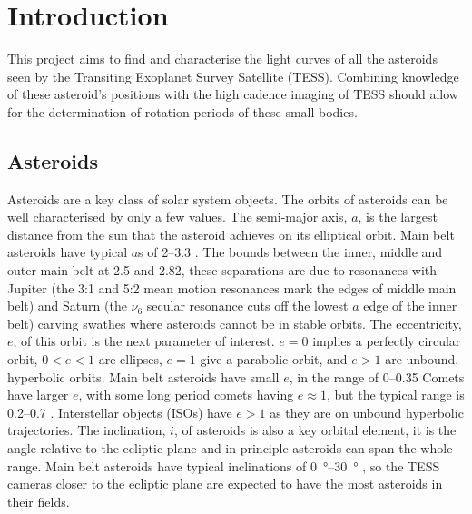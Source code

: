 \documentclass{UCreport}
\begin{document}
\toc %

\listoffigures
\newpage
{}
\listoftables
\newpage


\section{Introduction}\label{Sec:Intro}

This project aims to find and characterise the light curves of all the asteroids seen by the Transiting Exoplanet Survey Satellite (TESS).
Combining knowledge of these asteroid's positions with the high cadence imaging of TESS should allow for the determination of rotation periods of these small bodies.


\subsection{Asteroids}\label{SubSec:Asteroid}

Asteroids are a key class of solar system objects.
The orbits of asteroids can be well characterised by only a few values. The semi-major axis, $a$, is the largest distance from the sun that the asteroid achieves on its elliptical orbit.
Main belt asteroids have typical $a$s of \qtyrange{2}{3.3}{\au} \citet{DeMeo2015}.
The bounds between the inner, middle and outer main belt at \qty{2.5}{\au} and \qty{2.82}{\au}, these separations are due to resonances with Jupiter (the 3:1 and 5:2 mean motion resonances mark the edges of middle main belt) and Saturn (the $\nu_6$ secular resonance cuts off the lowest $a$ edge of the inner belt) carving swathes where asteroids cannot be in stable orbits.
The eccentricity, $e$, of this orbit is the next parameter of interest. $e=0$ implies a perfectly circular orbit, $0<e<1$ are ellipses, $e=1$ give a parabolic orbit, and $e>1$ are unbound, hyperbolic orbits.
Main belt asteroids have small $e$, in the range of \qtyrange{0}{0.35}{} \citep{DeMeo2015}
Comets have larger $e$, with some long period comets having $e\approx 1$, but the typical range is \qtyrange{0.2}{0.7}{} \citep{Lewis2012}.
Interstellar objects (ISOs) have $e>1$ as they are on unbound hyperbolic trajectories.
The inclination, $i$, of asteroids is also a key orbital element, it is the angle relative to the ecliptic plane and in principle asteroids can span the whole range.
Main belt asteroids have typical inclinations of \qtyrange{0}{30}{\degree} \citep{DeMeo2015}, so the TESS cameras closer to the ecliptic plane are expected to have the most asteroids in their fields.
\end{document}
